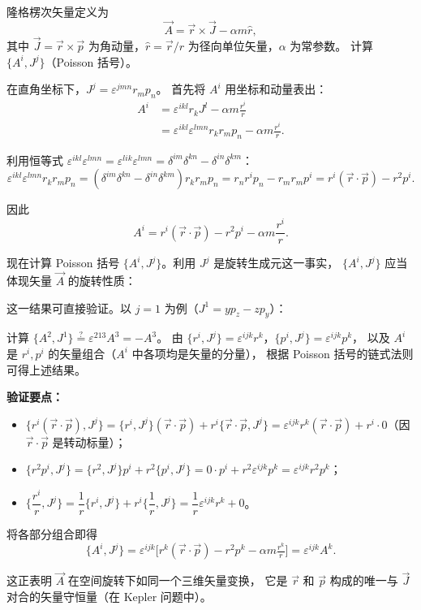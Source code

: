 \begin{question}[隆格楞次矢量]
隆格楞次矢量定义为
\[
\vec A=\vec r\times\vec J-\alpha m\hat r,
\]
其中 $\vec J=\vec r\times\vec p$ 为角动量，$\hat r=\vec r/r$ 为径向单位矢量，$\alpha$ 为常参数。
计算 $\{A^{i},J^{j}\}$（Poisson 括号）。

\begin{solution}

在直角坐标下，$J^{j}=\varepsilon^{jmn}r_{m}p_{n}$。
首先将 $A^{i}$ 用坐标和动量表出：
\begin{align*}
A^{i}&=\varepsilon^{ikl}r_{k}J^{l}-\alpha m\frac{r^{i}}{r} \\
&=\varepsilon^{ikl}\varepsilon^{lmn}r_{k}r_{m}p_{n}
-\alpha m\frac{r^{i}}{r}.
\end{align*}

利用恒等式 $\varepsilon^{ikl}\varepsilon^{lmn}
=\varepsilon^{lik}\varepsilon^{lmn}
=\delta^{im}\delta^{kn}-\delta^{in}\delta^{km}$：
\[
\varepsilon^{ikl}\varepsilon^{lmn}r_{k}r_{m}p_{n}
=(\delta^{im}\delta^{kn}-\delta^{in}\delta^{km})r_{k}r_{m}p_{n}
=r_{n}r^{i}p_{n}-r_{m}r_{m}p^{i}
=r^{i}(\vec r\cdot\vec p)-r^{2}p^{i}.
\]

因此
\[
A^{i}=r^{i}(\vec r\cdot\vec p)-r^{2}p^{i}-\alpha m\frac{r^{i}}{r}.
\]

现在计算 Poisson 括号 $\{A^{i},J^{j}\}$。利用 $J^{j}$ 是旋转生成元这一事实，
$\{A^{i},J^{j}\}$ 应当体现矢量 $\vec A$ 的旋转性质：


这一结果可直接验证。以 $j=1$ 为例（$J^{1}=yp_{z}-zp_{y}$）：

计算 $\{A^{2},J^{1}\}\stackrel{?}{=}\varepsilon^{213}A^{3}=-A^{3}$。
由 $\{r^{i},J^{j}\}=\varepsilon^{ijk}r^{k}$，$\{p^{i},J^{j}\}=\varepsilon^{ijk}p^{k}$，
以及 $A^{i}$ 是 $r^{i},p^{i}$ 的矢量组合（$A^{i}$ 中各项均是矢量的分量），
根据 Poisson 括号的链式法则可得上述结果。

\textbf{验证要点：}
\begin{itemize}
  \item $\{r^{i}(\vec r\cdot\vec p),J^{j}\}
  =\{r^{i},J^{j}\}(\vec r\cdot\vec p)+r^{i}\{\vec r\cdot\vec p,J^{j}\}
  =\varepsilon^{ijk}r^{k}(\vec r\cdot\vec p)+r^{i}\cdot0$（因 $\vec r\cdot\vec p$ 是转动标量）；
  \item $\{r^{2}p^{i},J^{j}\}
  =\{r^{2},J^{j}\}p^{i}+r^{2}\{p^{i},J^{j}\}
  =0\cdot p^{i}+r^{2}\varepsilon^{ijk}p^{k}
  =\varepsilon^{ijk}r^{2}p^{k}$；
  \item $\bigl\{\dfrac{r^{i}}{r},J^{j}\bigr\}
  =\dfrac{1}{r}\{r^{i},J^{j}\}+r^{i}\bigl\{\dfrac{1}{r},J^{j}\bigr\}
  =\dfrac{1}{r}\varepsilon^{ijk}r^{k}+0$。
\end{itemize}

将各部分组合即得
\[
\{A^{i},J^{j}\}
=\varepsilon^{ijk}\bigl[r^{k}(\vec r\cdot\vec p)-r^{2}p^{k}-\alpha m\tfrac{r^{k}}{r}\bigr]
=\varepsilon^{ijk}A^{k}.
\]

这正表明 $\vec A$ 在空间旋转下如同一个三维矢量变换，
它是 $\vec r$ 和 $\vec p$ 构成的唯一与 $\vec J$ 对合的矢量守恒量（在 Kepler 问题中）。
\end{solution}
\end{question}


